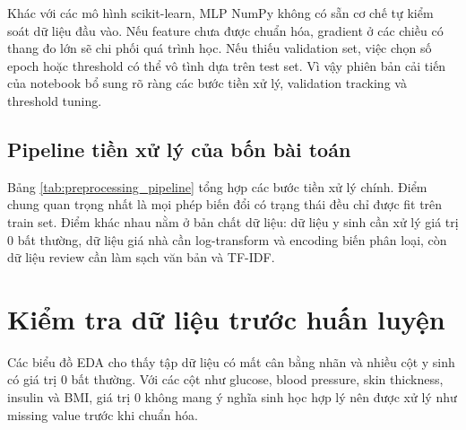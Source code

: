 \documentclass[12pt,a4paper]{report}
\begin{document}
Khác với các mô hình scikit-learn, MLP NumPy không có sẵn cơ chế tự kiểm soát dữ liệu đầu vào.
Nếu feature chưa được chuẩn hóa, gradient ở các chiều có thang đo lớn sẽ chi phối quá trình học.
Nếu thiếu validation set, việc chọn số epoch hoặc threshold có thể vô tình dựa trên test set.
Vì vậy phiên bản cải tiến của notebook bổ sung rõ ràng các bước tiền xử lý, validation tracking và threshold tuning.

\subsection{Pipeline tiền xử lý của bốn bài toán}
Bảng \ref{tab:preprocessing_pipeline} tổng hợp các bước tiền xử lý chính.
Điểm chung quan trọng nhất là mọi phép biến đổi có trạng thái đều chỉ được fit trên train set.
Điểm khác nhau nằm ở bản chất dữ liệu: dữ liệu y sinh cần xử lý giá trị 0 bất thường, dữ liệu giá nhà cần log-transform và encoding biến phân loại, còn dữ liệu review cần làm sạch văn bản và TF-IDF.

\begin{table}[H]
\centering
\caption{Pipeline tiền xử lý theo từng bài toán}
\label{tab:preprocessing_pipeline}
\end{table}

\section{Kiểm tra dữ liệu trước huấn luyện}
Các biểu đồ EDA cho thấy tập dữ liệu có mất cân bằng nhãn và nhiều cột y sinh có giá trị 0 bất thường. Với các cột như glucose, blood pressure, skin thickness, insulin và BMI, giá trị 0 không mang ý nghĩa sinh học hợp lý nên được xử lý như missing value trước khi chuẩn hóa.
\end{document}

